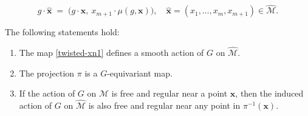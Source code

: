 \documentclass[10pt,a4paper]{amsart}
\begin{document}
\begin{equation}\label{twisted-xn1}
g \cdot \boldsymbol{\hat x}
\;=\;
\bigl(g \cdot \boldsymbol x,\ x_{m+1} \cdot \mu(g,\boldsymbol x)\bigr),
\quad
\boldsymbol{\hat x} = (x_1, \dots, x_m, x_{m+1}) \in \widehat{\mathcal M}.
\end{equation}

\begin{theorem}\label{twisted-action}
The following statements hold:
\begin{enumerate}\itemsep=2pt
\item[(\textit{i})] The map \eqref{twisted-xn1} defines a smooth action of $G$ on $\widehat{\mathcal M}$.
\item[(\textit{ii})] The projection $\pi$ is a $G$-equivariant map.
\item[(\textit{iii})] If the action of $G$ on $\mathcal M$ is free and regular near a point $\boldsymbol x$, then the induced action of $G$ on $\widehat{\mathcal M}$ is also free and regular near any point in $\pi^{-1}(\boldsymbol x)$.
\end{enumerate}
\end{theorem}
\end{document}
